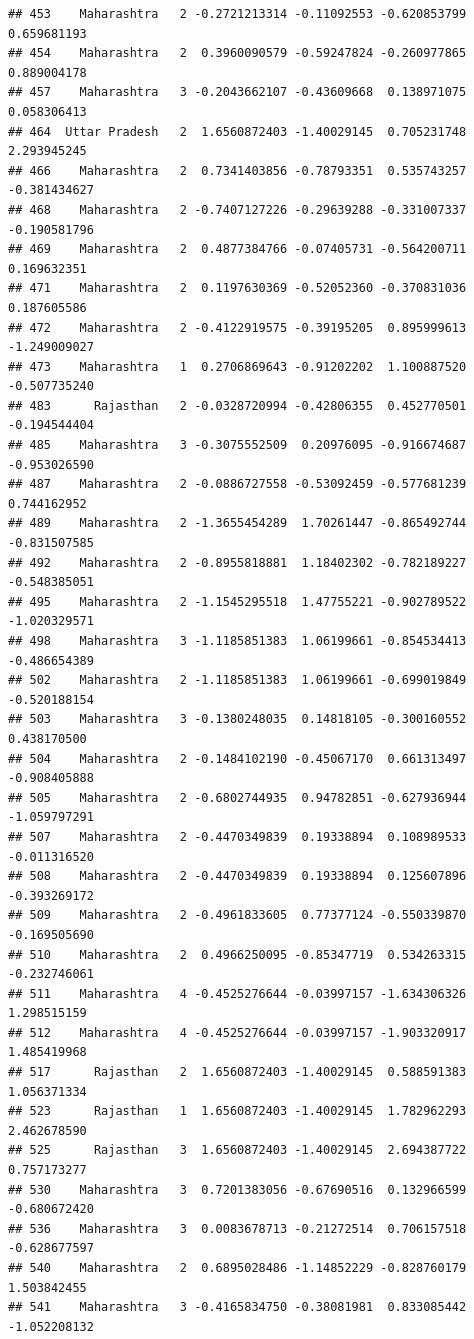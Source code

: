 \documentclass[
]{article}
\begin{document}
\begin{verbatim}
## 453    Maharashtra   2 -0.2721213314 -0.11092553 -0.620853799  0.659681193
## 454    Maharashtra   2  0.3960090579 -0.59247824 -0.260977865  0.889004178
## 457    Maharashtra   3 -0.2043662107 -0.43609668  0.138971075  0.058306413
## 464  Uttar Pradesh   2  1.6560872403 -1.40029145  0.705231748  2.293945245
## 466    Maharashtra   2  0.7341403856 -0.78793351  0.535743257 -0.381434627
## 468    Maharashtra   2 -0.7407127226 -0.29639288 -0.331007337 -0.190581796
## 469    Maharashtra   2  0.4877384766 -0.07405731 -0.564200711  0.169632351
## 471    Maharashtra   2  0.1197630369 -0.52052360 -0.370831036  0.187605586
## 472    Maharashtra   2 -0.4122919575 -0.39195205  0.895999613 -1.249009027
## 473    Maharashtra   1  0.2706869643 -0.91202202  1.100887520 -0.507735240
## 483      Rajasthan   2 -0.0328720994 -0.42806355  0.452770501 -0.194544404
## 485    Maharashtra   3 -0.3075552509  0.20976095 -0.916674687 -0.953026590
## 487    Maharashtra   2 -0.0886727558 -0.53092459 -0.577681239  0.744162952
## 489    Maharashtra   2 -1.3655454289  1.70261447 -0.865492744 -0.831507585
## 492    Maharashtra   2 -0.8955818881  1.18402302 -0.782189227 -0.548385051
## 495    Maharashtra   2 -1.1545295518  1.47755221 -0.902789522 -1.020329571
## 498    Maharashtra   3 -1.1185851383  1.06199661 -0.854534413 -0.486654389
## 502    Maharashtra   2 -1.1185851383  1.06199661 -0.699019849 -0.520188154
## 503    Maharashtra   3 -0.1380248035  0.14818105 -0.300160552  0.438170500
## 504    Maharashtra   2 -0.1484102190 -0.45067170  0.661313497 -0.908405888
## 505    Maharashtra   2 -0.6802744935  0.94782851 -0.627936944 -1.059797291
## 507    Maharashtra   2 -0.4470349839  0.19338894  0.108989533 -0.011316520
## 508    Maharashtra   2 -0.4470349839  0.19338894  0.125607896 -0.393269172
## 509    Maharashtra   2 -0.4961833605  0.77377124 -0.550339870 -0.169505690
## 510    Maharashtra   2  0.4966250095 -0.85347719  0.534263315 -0.232746061
## 511    Maharashtra   4 -0.4525276644 -0.03997157 -1.634306326  1.298515159
## 512    Maharashtra   4 -0.4525276644 -0.03997157 -1.903320917  1.485419968
## 517      Rajasthan   2  1.6560872403 -1.40029145  0.588591383  1.056371334
## 523      Rajasthan   1  1.6560872403 -1.40029145  1.782962293  2.462678590
## 525      Rajasthan   3  1.6560872403 -1.40029145  2.694387722  0.757173277
## 530    Maharashtra   3  0.7201383056 -0.67690516  0.132966599 -0.680672420
## 536    Maharashtra   3  0.0083678713 -0.21272514  0.706157518 -0.628677597
## 540    Maharashtra   2  0.6895028486 -1.14852229 -0.828760179  1.503842455
## 541    Maharashtra   3 -0.4165834750 -0.38081981  0.833085442 -1.052208132

\end{verbatim}
\end{document}
